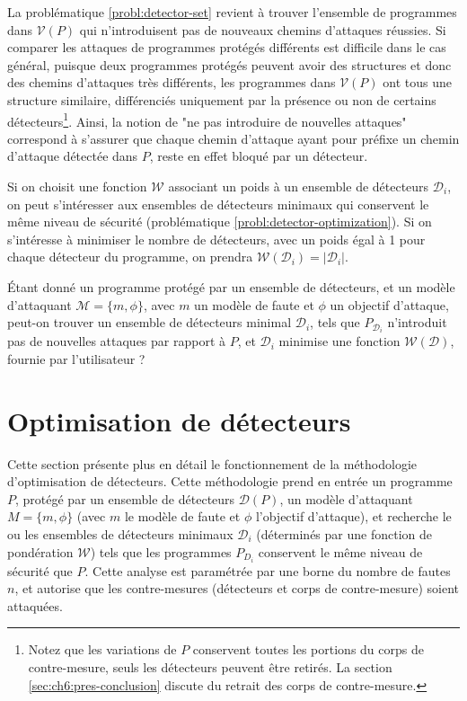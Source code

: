             La problématique \ref{probl:detector-set} revient à trouver l'ensemble de programmes dans $\mathcal{V}(P)$ qui n'introduisent pas de nouveaux chemins d'attaques réussies.
            Si comparer les attaques de programmes protégés différents est difficile dans le cas général, puisque deux programmes protégés peuvent avoir des structures et donc des chemins d'attaques très différents, les programmes dans $\mathcal{V}(P)$ ont tous une structure similaire, différenciés uniquement par la présence ou non de certains détecteurs\footnote{Notez que les variations de $P$ conservent toutes les portions du corps de contre-mesure, seuls les détecteurs peuvent être retirés. La section \ref{sec:ch6:pres-conclusion} discute du retrait des corps de contre-mesure.}.
            Ainsi, la notion de "ne pas introduire de nouvelles attaques" correspond à s'assurer que chaque chemin d'attaque ayant pour préfixe un chemin d'attaque détectée dans $P$, reste en effet bloqué par un détecteur. 
            
            Si on choisit une fonction $\mathcal{W}$ associant un poids à un ensemble de détecteurs $\mathcal{D}_i$, on peut s'intéresser aux ensembles de détecteurs minimaux qui conservent le même niveau de sécurité (problématique \ref{probl:detector-optimization}).
            Si on s'intéresse à minimiser le nombre de détecteurs, avec un poids égal à 1 pour chaque détecteur du programme, on prendra $\mathcal{W}(\mathcal{D}_i ) = |\mathcal{D}_i|$.
            
            \begin{probl}
                \label{probl:detector-optimization}
                Étant donné un programme protégé par un ensemble de détecteurs, et un modèle d'attaquant $\mathcal{M} = \{m, \phi\}$, avec $m$ un modèle de faute et $\phi$ un objectif d'attaque, peut-on trouver un ensemble de détecteurs minimal $\mathcal{D}_i$, tels que $P_{\mathcal{D}_i}$ n'introduit pas de nouvelles attaques par rapport à $P$, et $\mathcal{D}_i$ minimise une fonction $\mathcal{W}(\mathcal{D})$, fournie par l'utilisateur ?
            \end{probl}

    \section{Optimisation de détecteurs}
    \label{sec:ch6:ccpo}

        Cette section présente plus en détail le fonctionnement de la méthodologie d'optimisation de détecteurs.  
        Cette méthodologie prend en entrée un programme $P$, protégé par un ensemble de détecteurs $\mathcal{D}(P)$, un modèle d'attaquant $M = \{m, \phi\}$ (avec $m$ le modèle de faute et $\phi$ l'objectif d'attaque), et recherche le ou les ensembles de détecteurs minimaux $\mathcal{D}_i$ (déterminés par une fonction de pondération $\mathcal{W}$) tels que les programmes $P_{D_i}$ conservent le même niveau de sécurité que $P$. Cette analyse est paramétrée par une borne du nombre de fautes $n$, et autorise que les contre-mesures (détecteurs et corps de contre-mesure) soient attaquées.
                
